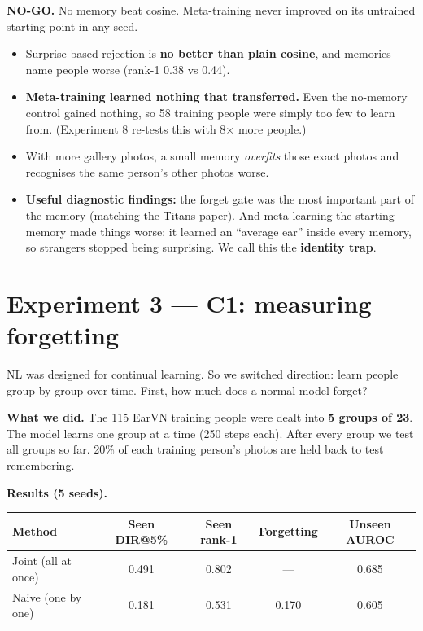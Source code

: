\documentclass[11pt,a4paper]{article}
\begin{document}
\begin{verdict}
\textbf{NO-GO.} No memory beat cosine. Meta-training never improved on its untrained starting point in any seed.
\end{verdict}

\begin{means}
\begin{itemize}[leftmargin=1.2em]
  \item Surprise-based rejection is \textbf{no better than plain cosine}, and memories name people worse (rank-1 0.38 vs 0.44).
  \item \textbf{Meta-training learned nothing that transferred.} Even the no-memory control gained nothing, so 58 training people were simply too few to learn from. (Experiment 8 re-tests this with 8$\times$ more people.)
  \item With more gallery photos, a small memory \emph{overfits} those exact photos and recognises the same person's other photos worse.
  \item \textbf{Useful diagnostic findings:} the forget gate was the most important part of the memory (matching the Titans paper). And meta-learning the starting memory made things worse: it learned an ``average ear'' inside every memory, so strangers stopped being surprising. We call this the \textbf{identity trap}.
\end{itemize}
\end{means}

\section{Experiment 3 --- C1: measuring forgetting}

\begin{question}
NL was designed for continual learning. So we switched direction: learn people group by group over time. First, how much does a normal model forget?
\end{question}

\textbf{What we did.} The 115 EarVN training people were dealt into \textbf{5 groups of 23}. The model learns one group at a time (250 steps each). After every group we test all groups so far. 20\% of each training person's photos are held back to test remembering.

\textbf{Results (5 seeds).}
\begin{center}
\begin{tabular}{@{}lcccc@{}}
\toprule
\textbf{Method} & \textbf{Seen DIR@5\%} & \textbf{Seen rank-1} & \textbf{Forgetting} & \textbf{Unseen AUROC}\\
\midrule
Joint (all at once) & 0.491 & 0.802 & --- & 0.685\\
Naive (one by one) & 0.181 & 0.531 & 0.170 & 0.605\\
\bottomrule
\end{tabular}
\end{center}
\end{document}

